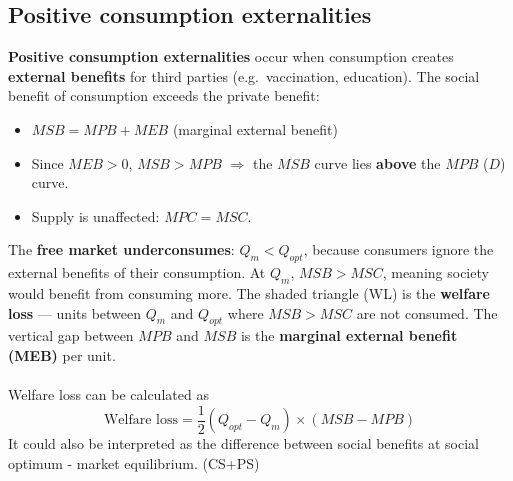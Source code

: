 \subsection{Positive consumption externalities}
\textbf{Positive consumption externalities} occur when consumption creates \textbf{external benefits} for third parties (e.g.\ vaccination, education). The social benefit of consumption exceeds the private benefit:
\begin{itemize}
  \item $MSB = MPB + MEB$ (marginal external benefit)
  \item Since $MEB > 0$, $MSB > MPB$ $\Rightarrow$ the $MSB$ curve lies \textbf{above} the $MPB$ ($D$) curve.
  \item Supply is unaffected: $MPC = MSC$.
\end{itemize}

\begin{center}
\end{center}
The \textbf{free market underconsumes}: $Q_m < Q_{opt}$, because consumers ignore the external benefits of their consumption. At $Q_m$, $MSB > MSC$, meaning society would benefit from consuming more. The shaded triangle (WL) is the \textbf{welfare loss} --- units between $Q_m$ and $Q_{opt}$ where $MSB > MSC$ are not consumed. The vertical gap between $MPB$ and $MSB$ is the \textbf{marginal external benefit (MEB)} per unit.\\\\
Welfare loss can be calculated as 
\[\text{Welfare loss}=\dfrac{1}{2}(Q_{opt}-Q_m)\times (MSB-MPB)\]
It could also be interpreted as the difference between social benefits at social optimum - market equilibrium. (CS+PS)
